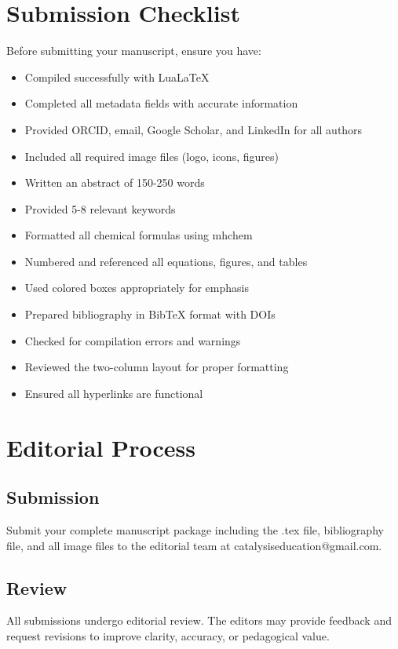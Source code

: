 \documentclass[10pt, a4paper]{article}
\begin{document}
	\section{Submission Checklist}
	
	Before submitting your manuscript, ensure you have:
	
	\begin{itemize}
		\item Compiled successfully with LuaLaTeX
		\item Completed all metadata fields with accurate information
		\item Provided ORCID, email, Google Scholar, and LinkedIn for all authors
		\item Included all required image files (logo, icons, figures)
		\item Written an abstract of 150-250 words
		\item Provided 5-8 relevant keywords
		\item Formatted all chemical formulas using mhchem
		\item Numbered and referenced all equations, figures, and tables
		\item Used colored boxes appropriately for emphasis
		\item Prepared bibliography in BibTeX format with DOIs
		\item Checked for compilation errors and warnings
		\item Reviewed the two-column layout for proper formatting
		\item Ensured all hyperlinks are functional
	\end{itemize}
	
	\section{Editorial Process}
	
	\subsection{Submission} Submit your complete manuscript package including the .tex file, bibliography file, and all image files to the editorial team at catalysiseducation@gmail.com.
	
	\subsection{Review} All submissions undergo editorial review. The editors may provide feedback and request revisions to improve clarity, accuracy, or pedagogical value.
	
\end{document}
